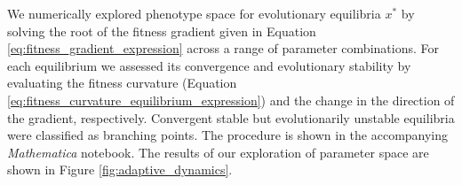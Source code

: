We numerically explored phenotype space for evolutionary equilibria $x^*$ by solving the root of the fitness gradient given in Equation \ref{eq:fitness_gradient_expression} across a range of parameter combinations. For each equilibrium we assessed its convergence and evolutionary stability by evaluating the fitness curvature (Equation \ref{eq:fitness_curvature_equilibrium_expression}) and the change in the direction of the gradient, respectively. Convergent stable but evolutionarily unstable equilibria were classified as branching points. The procedure is shown in the accompanying \textit{Mathematica} notebook. The results of our exploration of parameter space are shown in Figure \ref{fig:adaptive_dynamics}.




